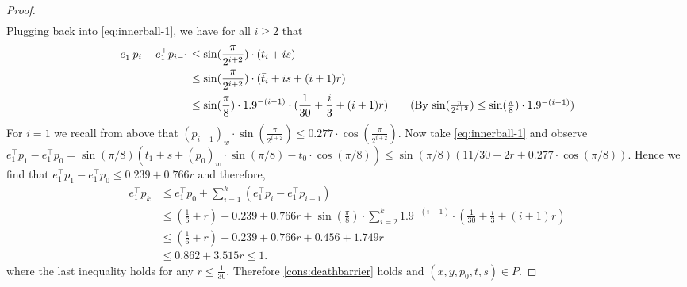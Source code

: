\documentclass{theoretics}
\begin{document}
\begin{proof}
\begin{align*}
    \end{align*}
    Plugging back into \eqref{eq:innerball-1}, we have for all $i\geq 2$ that
    \begin{align*}
        e_1^\top p_i - e_1^\top p_{i-1} &\leq \sin(\frac{\pi}{2^{i + 2}}) \cdot (t_i + is) \\
        &\leq \sin(\frac{\pi}{2^{i + 2}}) \cdot (\bar{t}_i + i\bar{s} + (i+1)r) \\
        &\leq \sin(\frac{\pi}{8}) \cdot 1.9^{-(i-1)} \cdot (\frac{1}{30} + \frac{i}{3} + (i+1)r) \tag{By $\sin(\frac{\pi}{2^{i + 2}}) \leq \sin(\frac{\pi}{8}) \cdot 1.9^{-(i-1)}$}
    \end{align*}
    For $i=1$ we recall from above that $(p_{i-1})_w \cdot \sin(\frac{\pi}{2^{i + 2}}) \leq 0.277 \cdot \cos(\frac{\pi}{2^{i+2}})$.
    Now take \eqref{eq:innerball-1} and observe
    $e_1^\top p_1 - e_1^\top p_0 = \sin(\pi/8)(t_1 + s + (p_0)_w \cdot\sin(\pi/8) - t_0\cdot\cos(\pi/8))
    \leq \sin(\pi/8)(11/30 + 2r + 0.277 \cdot \cos(\pi/8))$.
    Hence we find that $e_1^\top p_1 - e_1^\top p_0 \leq 0.239 + 0.766r$    
    and therefore,
    \begin{align*}
        e_1^\top p_k &\leq e_1^\top p_0 + \sum_{i=1}^k (e_1^\top p_i - e_1^\top p_{i-1}) \\
        &\leq (\frac{1}{6} + r) + 0.239 + 0.766r + \sin(\frac{\pi}{8}) \cdot \sum_{i=2}^k 1.9^{-(i-1)} \cdot (\frac{1}{30} + \frac{i}{3} + (i+1)r) \\
        &\leq (\frac{1}{6} + r) + 0.239 + 0.766r + 0.456 + 1.749r \\
        &\leq 0.862 + 3.515 r \leq 1.
    \end{align*}
    where the last inequality holds for any $r \leq \frac{1}{30}$.
    Therefore \eqref{cons:deathbarrier} holds and $(x, y, p_0, t, s) \in P$.
\end{proof}
\end{document}
